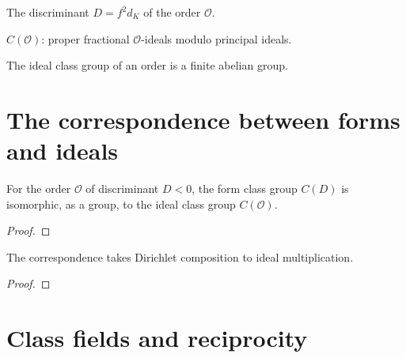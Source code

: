 \begin{definition}
  \label{def:order_discriminant}
  \leanok
  The discriminant $D = f^2 d_K$ of the order $\mathcal O$.
\end{definition}

\begin{definition}
  \label{def:ideal_class_group_order}
  \leanok
  $C(\mathcal O)$: proper fractional $\mathcal O$-ideals modulo principal ideals.
\end{definition}

\begin{theorem}
  \label{thm:ideal_class_group_finite}
  \leanok
  The ideal class group of an order is a finite abelian group.
\end{theorem}

\section{The correspondence between forms and ideals}

\begin{theorem}
  \label{thm:form_ideal_bridge}
  \leanok
  For the order $\mathcal O$ of discriminant $D < 0$, the form class group $C(D)$ is
  isomorphic, as a group, to the ideal class group $C(\mathcal O)$.
\end{theorem}
\begin{proof}
\end{proof}

\begin{theorem}
  \label{thm:bridge_composition}
  \leanok
  The correspondence takes Dirichlet composition to ideal multiplication.
\end{theorem}
\begin{proof}
\end{proof}

\section{Class fields and reciprocity}

